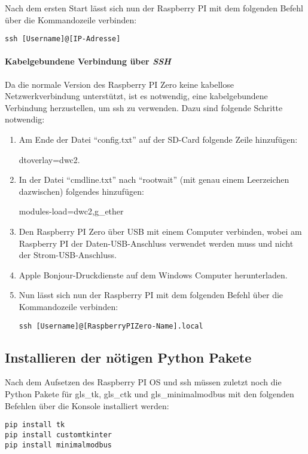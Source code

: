 Nach dem ersten Start lässt sich nun der Raspberry PI mit dem folgenden Befehl über die Kommandozeile verbinden:
\begin{verbatim}
ssh [Username]@[IP-Adresse]
\end{verbatim}

\paragraph{Kabelgebundene Verbindung über \textit{SSH}}
Da die normale Version des Raspberry PI Zero keine kabellose Netzwerkverbindung unterstützt, ist es notwendig, eine kabelgebundene Verbindung herzustellen, um \ac{ssh} zu verwenden. Dazu sind folgende Schritte notwendig:

\begin{enumerate}
    \item Am Ende der Datei \enquote{config.txt} auf der SD-Card folgende Zeile hinzufügen: \begin{textcode}
    dtoverlay=dwc2.
    \end{textcode}
    \item In der Datei \enquote{cmdline.txt} nach \enquote{rootwait} (mit genau einem Leerzeichen dazwischen) folgendes hinzufügen:
    \begin{textcode}
    modules-load=dwc2,g_ether
    \end{textcode}
    \item Den Raspberry PI Zero über USB mit einem Computer verbinden, wobei am Raspberry PI der Daten-USB-Anschluss verwendet werden muss und nicht der Strom-USB-Anschluss.
    \item Apple Bonjour-Druckdienste auf dem Windows Computer herunterladen.
    \item Nun lässt sich nun der Raspberry PI mit dem folgenden Befehl über die Kommandozeile verbinden:
    \begin{verbatim}
ssh [Username]@[RaspberryPIZero-Name].local
    \end{verbatim}
\end{enumerate}

\subsection{Installieren der nötigen Python Pakete}
Nach dem Aufsetzen des Raspberry PI OS und \ac{ssh} müssen zuletzt noch die Python Pakete für \gls{gls_tk}, \gls{gls_ctk} und \gls{gls_minimalmodbus} mit den folgenden Befehlen über die Konsole installiert werden:

\begin{verbatim}
pip install tk
pip install customtkinter
pip install minimalmodbus
\end{verbatim}
